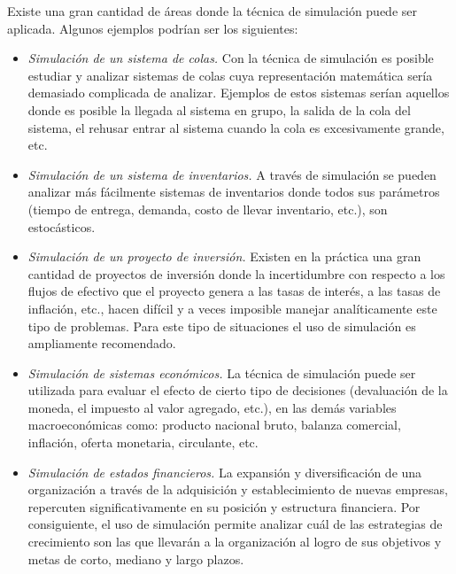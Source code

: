 \documentclass[11pt,letterpaper]{report}
\begin{document}
Existe una gran cantidad de áreas donde la técnica de simulación puede
ser aplicada. Algunos ejemplos podrían ser los siguientes:

\begin{itemize}[leftmargin=*]
\item \emph{Simulación de un sistema de colas.} Con la técnica de
simulación es posible estudiar y analizar sistemas de colas cuya
representación matemática sería demasiado complicada de analizar.
Ejemplos de estos sistemas serían aquellos donde es posible la llegada
al sistema en grupo, la salida de la cola del sistema, el rehusar entrar
al sistema cuando la cola es excesivamente grande, etc.
\item \emph{Simulación de un sistema de inventarios.} A través de
simulación se pueden analizar más fácilmente sistemas de inventarios
donde todos sus parámetros (tiempo de entrega, demanda, costo de llevar
inventario, etc.), son estocásticos.
\item \emph{Simulación de un proyecto de inversión.} Existen en la
práctica una gran cantidad de proyectos de inversión donde la
incertidumbre con respecto a los flujos de efectivo que el proyecto
genera a las tasas de interés, a las tasas de inflación, etc., hacen
difícil y a veces imposible manejar analíticamente este tipo de
problemas. Para este tipo de situaciones el uso de simulación es
ampliamente recomendado.
\item \emph{Simulación de sistemas económicos.} La técnica de
simulación puede ser utilizada para evaluar el efecto de cierto tipo de
decisiones (devaluación de la moneda, el impuesto al valor agregado,
etc.), en las demás variables macroeconómicas como: producto nacional
bruto, balanza comercial, inflación, oferta monetaria, circulante, etc.
\item \emph{Simulación de estados financieros.} La expansión y
diversificación de una organización a través de la adquisición y
establecimiento de nuevas empresas, repercuten significativamente en su
posición y estructura financiera. Por consiguiente, el uso de simulación
permite analizar cuál de las estrategias de crecimiento son las que
llevarán a la organización al logro de sus objetivos y metas de corto,
mediano y largo plazos.
\end{itemize}
\end{document}
